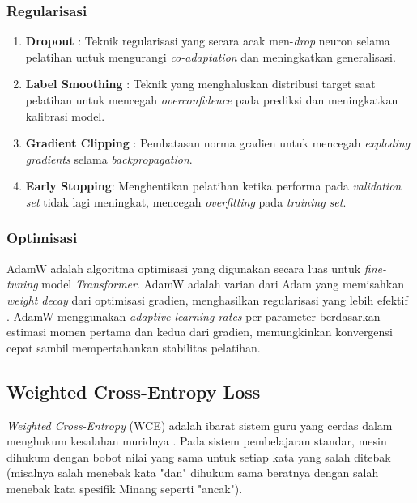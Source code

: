 \subsubsection{Regularisasi}

\begin{enumerate}[noitemsep]
    \item \textbf{Dropout} \cite{srivastava2014dropout}: Teknik regularisasi yang secara acak men-\textit{drop} neuron selama pelatihan untuk mengurangi \textit{co-adaptation} dan meningkatkan generalisasi.
    
    \item \textbf{Label Smoothing} \cite{szegedy2016rethinking}: Teknik yang menghaluskan distribusi target saat pelatihan untuk mencegah \textit{overconfidence} pada prediksi dan meningkatkan kalibrasi model.
    
    \item \textbf{Gradient Clipping} \cite{pascanu2013difficulty}: Pembatasan norma gradien untuk mencegah \textit{exploding gradients} selama \textit{backpropagation}.
    
    \item \textbf{Early Stopping}: Menghentikan pelatihan ketika performa pada \textit{validation set} tidak lagi meningkat, mencegah \textit{overfitting} pada \textit{training set}.
\end{enumerate}

\subsubsection{Optimisasi}

AdamW \cite{loshchilov2019adamw} adalah algoritma optimisasi yang digunakan secara luas untuk \textit{fine-tuning} model \textit{Transformer}. AdamW adalah varian dari Adam yang memisahkan \textit{weight decay} dari optimisasi gradien, menghasilkan regularisasi yang lebih efektif \cite{krogh1991regularization}. AdamW menggunakan \textit{adaptive learning rates} per-parameter berdasarkan estimasi momen pertama dan kedua dari gradien, memungkinkan konvergensi cepat sambil mempertahankan stabilitas pelatihan.

\subsection{Weighted Cross-Entropy Loss}
\label{II.WCE}

\textit{Weighted Cross-Entropy} (WCE) adalah ibarat sistem guru yang cerdas dalam menghukum kesalahan muridnya \cite{pineiromartin2024weighted}. Pada sistem pembelajaran standar, mesin dihukum dengan bobot nilai yang sama untuk setiap kata yang salah ditebak (misalnya salah menebak kata "dan" dihukum sama beratnya dengan salah menebak kata spesifik Minang seperti "ancak").

